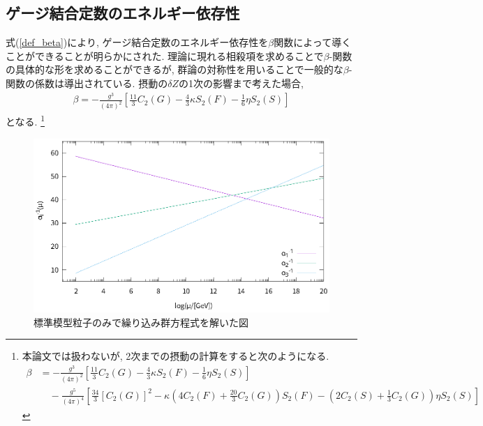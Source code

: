 \subsection{ゲージ結合定数のエネルギー依存性}
式(\ref{def_beta})により, ゲージ結合定数のエネルギー依存性を$\beta$関数によって導くことができることが明らかにされた.
理論に現れる相殺項を求めることで$\beta$-関数の具体的な形を求めることができるが, 群論の対称性を用いることで一般的な$\beta$-関数の係数は導出されている.
摂動の$\delta Z$の1次の影響まで考えた場合,
\begin{align}
  \beta = -\frac{g^3}{(4\pi)^2}\left[\frac{11}{3}C_2(G) -\frac{4}{3}\kappa S_2(F) - \frac{1}{6}\eta S_2(S)\right]
\end{align}
となる.\cite{grossUltravioletBehaviorNonAbelian1973,politzerReliablePerturbativeResults1973b}
\footnote{
本論文では扱わないが, 2次までの摂動の計算をすると次のようになる.
\cite{caswellAsymptoticBehaviorNonAbelian1974,jonesTwoloopDiagramsYangMills1974}
\begin{align}
  \beta &= -\frac{g^3}{(4\pi)^2}\left[\frac{11}{3}C_2(G) -\frac{4}{3}\kappa S_2(F) - \frac{1}{6}\eta S_2(S)\right] \nonumber\\
        &\quad-\frac{g^5}{(4\pi)^4}\left[ \frac{34}{3}[C_2(G)]^2 -\kappa\left(4C_2(F)+\frac{20}{3}C_2(G)\right)S_2(F) -\left(2C_2(S)+\frac{1}{3}C_2(G)\right)\eta S_2(S)\right] \nonumber
\end{align}
}

\begin{figure}[ht]
  \centering
  \includegraphics[width=12truecm,clip]{fig/RGE_SM.eps}
  \caption{標準模型粒子のみで繰り込み群方程式を解いた図}
  \label{fig:RGE_SM}
\end{figure}
